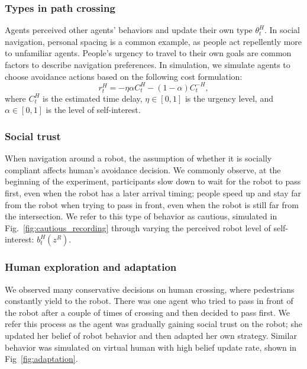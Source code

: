 \documentclass[letterpaper, 10 pt, conference]{ieeeconf}  %
\begin{document}
\subsubsection{Types in path crossing}
Agents perceived other agents' behaviors and update their own type $\theta^H_t$. In 
social navigation, personal spacing is a common example, as people act 
repellently more to unfamiliar agents. People's urgency to travel to their own 
goals are common factors to describe navigation preferences. In simulation, we 
simulate agents to choose avoidance actions based on the following cost formulation:
\begin{equation}
  r^H_t = -\eta \alpha C^H_t  -(1-\alpha) C^{-H}_t,
\end{equation}
where $C^H_t$ is the estimated time delay, $\eta \in [0,1]$ is the urgency 
level, and $\alpha \in [0,1]$ is the level of self-interest.
\subsubsection{Social trust}
When navigation around a robot, the assumption of whether it is socially 
compliant affects human's avoidance decision. We commonly observe, at the 
beginning of the experiment, participants slow down to wait for the robot to 
pass first, even when the robot has a later arrival 
timing; people speed up and stay far from the robot when trying to pass in 
front, even when the robot is still far from the intersection. 
We refer to this type of behavior as cautious, simulated in 
Fig.~\ref{fig:cautious_recording} through 
varying the perceived robot level of 
self-interest: $b^H_t(z^R)$. 
\subsubsection{Human exploration and adaptation}
We observed many conservative decisions on human crossing, where 
pedestrians constantly yield to the robot. 
There was one agent who tried to pass in front of the 
robot after a couple of times of crossing and then decided to pass first. We 
refer this process as the agent was gradually gaining social trust on the 
robot; she updated her belief of robot behavior and then adapted her own 
strategy. Similar behavior was simulated on virtual human with high belief 
update rate, shown in Fig~\ref{fig:adaptation}.   
\end{document}
